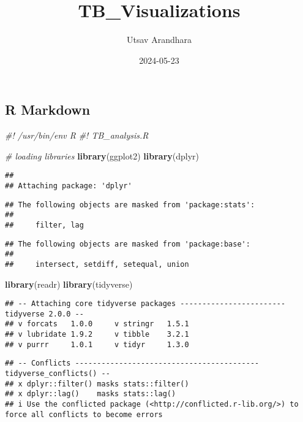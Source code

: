\documentclass[
]{article}
\title{TB\_Visualizations}
\author{Utsav Arandhara}
\date{2024-05-23}
\newenvironment{Shaded}{\begin{snugshade}}{\end{snugshade}}
\newcommand{\CommentTok}[1]{\textcolor[rgb]{0.56,0.35,0.01}{\textit{#1}}}
\newcommand{\FunctionTok}[1]{\textcolor[rgb]{0.13,0.29,0.53}{\textbf{#1}}}
\newcommand{\NormalTok}[1]{#1}
\begin{document}
\maketitle

\subsection{R Markdown}\label{r-markdown}

\begin{Shaded}
\begin{Highlighting}[]
\CommentTok{\#! /usr/bin/env R}
\CommentTok{\#! TB\_analysis.R}

\CommentTok{\# loading libraries}
\FunctionTok{library}\NormalTok{(ggplot2)}
\FunctionTok{library}\NormalTok{(dplyr)}
\end{Highlighting}
\end{Shaded}

\begin{verbatim}
## 
## Attaching package: 'dplyr'
\end{verbatim}

\begin{verbatim}
## The following objects are masked from 'package:stats':
## 
##     filter, lag
\end{verbatim}

\begin{verbatim}
## The following objects are masked from 'package:base':
## 
##     intersect, setdiff, setequal, union
\end{verbatim}

\begin{Shaded}
\begin{Highlighting}[]
\FunctionTok{library}\NormalTok{(readr)}
\FunctionTok{library}\NormalTok{(tidyverse)}
\end{Highlighting}
\end{Shaded}

\begin{verbatim}
## -- Attaching core tidyverse packages ------------------------ tidyverse 2.0.0 --
## v forcats   1.0.0     v stringr   1.5.1
## v lubridate 1.9.2     v tibble    3.2.1
## v purrr     1.0.1     v tidyr     1.3.0
\end{verbatim}

\begin{verbatim}
## -- Conflicts ------------------------------------------ tidyverse_conflicts() --
## x dplyr::filter() masks stats::filter()
## x dplyr::lag()    masks stats::lag()
## i Use the conflicted package (<http://conflicted.r-lib.org/>) to force all conflicts to become errors
\end{verbatim}
\end{document}
